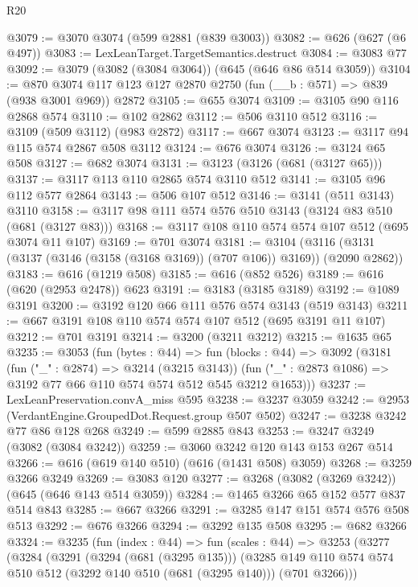 \begin{lexlean}{R20}
\begin{coremodule}
@3079 := @3070 @3074 (@599 @2881 (@839 @3003))
@3082 := @626 (@627 (@6 @497))
@3083 := LexLeanTarget.TargetSemantics.destruct
@3084 := @3083 @77
@3092 := @3079 (@3082 (@3084 @3064)) (@645 (@646 @86 @514 @3059))
@3104 := @870 @3074 @117 @123 @127 @2870 @2750 (fun (__b : @571) => @839 (@938 @3001 @969)) @2872
@3105 := @655 @3074
@3109 := @3105 @90 @116 @2868 @574
@3110 := @102 @2862
@3112 := @506 @3110 @512
@3116 := @3109 (@509 @3112) (@983 @2872)
@3117 := @667 @3074
@3123 := @3117 @94 @115 @574 @2867 @508 @3112
@3124 := @676 @3074
@3126 := @3124 @65 @508
@3127 := @682 @3074
@3131 := @3123 (@3126 (@681 (@3127 @65)))
@3137 := @3117 @113 @110 @2865 @574 @3110 @512
@3141 := @3105 @96 @112 @577 @2864
@3143 := @506 @107 @512
@3146 := @3141 (@511 @3143) @3110
@3158 := @3117 @98 @111 @574 @576 @510 @3143 (@3124 @83 @510 (@681 (@3127 @83)))
@3168 := @3117 @108 @110 @574 @574 @107 @512 (@695 @3074 @11 @107)
@3169 := @701 @3074
@3181 := @3104 (@3116 (@3131 (@3137 (@3146 (@3158 (@3168 @3169)) (@707 @106)) @3169)) (@2090 @2862))
@3183 := @616 (@1219 @508)
@3185 := @616 (@852 @526)
@3189 := @616 (@620 (@2953 @2478)) @623
@3191 := @3183 (@3185 @3189)
@3192 := @1089 @3191
@3200 := @3192 @120 @66 @111 @576 @574 @3143 (@519 @3143)
@3211 := @667 @3191 @108 @110 @574 @574 @107 @512 (@695 @3191 @11 @107)
@3212 := @701 @3191
@3214 := @3200 (@3211 @3212)
@3215 := @1635 @65
@3235 := @3053
    (fun (bytes : @44) =>
    fun (blocks : @44) =>
    @3092
      (@3181
        (fun ("_" : @2874) => @3214 (@3215 @3143))
        (fun ("_" : @2873 @1086) => @3192 @77 @66 @110 @574 @574 @512 @545 @3212 @1653)))
@3237 := LexLeanPreservation.convA_miss @595
@3238 := @3237 @3059
@3242 := @2953 (VerdantEngine.GroupedDot.Request.group @507 @502)
@3247 := @3238 @3242 @77 @86 @128 @268
@3249 := @599 @2885 @843
@3253 := @3247 @3249 (@3082 (@3084 @3242))
@3259 := @3060 @3242 @120 @143 @153 @267 @514
@3266 := @616 (@619 @140 @510) (@616 (@1431 @508) @3059)
@3268 := @3259 @3266 @3249
@3269 := @3083 @120
@3277 := @3268 (@3082 (@3269 @3242)) (@645 (@646 @143 @514 @3059))
@3284 := @1465 @3266 @65 @152 @577 @837 @514 @843
@3285 := @667 @3266
@3291 := @3285 @147 @151 @574 @576 @508 @513
@3292 := @676 @3266
@3294 := @3292 @135 @508
@3295 := @682 @3266
@3324 := @3235
    (fun (index : @44) =>
    fun (scales : @44) =>
    @3253
      (@3277
        (@3284
          (@3291
            (@3294 (@681 (@3295 @135)))
            (@3285
              @149
              @110
              @574
              @574
              @510
              @512
              (@3292 @140 @510 (@681 (@3295 @140)))
              (@701 @3266)))

\end{coremodule}
\end{lexlean}
